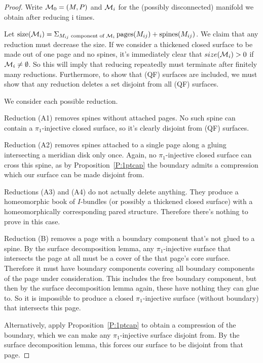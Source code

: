 \begin{proof}

Write $\mathcal{M}_0 = (M,P)$ and $\mathcal{M}_i$ for the (possibly disconnected) manifold we
obtain after reducing i times.

Let $\operatorname{size}(\mathcal{M}_i) = \Sigma_{M_{ij} \text{ component of } \mathcal{M}_i}
\operatorname{pages}(M_{ij}) + \operatorname{spines}(M_{ij})$. We claim that
any reduction must decrease the size. If we consider a thickened closed surface
to be made out of one page and no spines, it's immediately clear that
$size(\mathcal{M}_i)>0$ if $\mathcal{M}_i \neq \emptyset$.  So this will imply that reducing
repeatedly must terminate after finitely many reductions. Furthermore, to show
that (QF) surfaces are included, we must show that any reduction deletes a set
disjoint from all (QF) surfaces.

We consider each possible reduction.

Reduction (A1) removes spines without attached pages. No such spine can contain
a $\pi_1$-injective closed surface, so it's clearly disjoint from (QF)
surfaces.

Reduction (A2) removes spines attached to a single page along a gluing
intersecting a meridian disk only once. Again, no $\pi_1$-injective closed
surface can cross this spine, as by Proposition~\ref{P:1ptcap} the boundary
admits a compression which our surface can be made disjoint from.

Reductions (A3) and (A4) do not actually delete anything. They produce
a homeomorphic book of $I$-bundles (or possibly a thickened closed surface)
with a homeomorphically corresponding pared structure. Therefore there's
nothing to prove in this case.

Reduction (B) removes a page with a boundary component that's not glued to
a spine. By the surface decomposition lemma, any $\pi_1$-injective surface that
intersects the page at all must be a cover of the that page's core surface.
Therefore it must have boundary components covering all boundary components of
the page under consideration. This includes the free boundary component, but
then by the surface decomposition lemma again, these have nothing they can glue
to. So it is impossible to produce a closed $\pi_1$-injective surface (without
boundary) that intersects this page.

Alternatively, apply Proposition~\ref{P:1ptcap} to obtain a compression of the
boundary, which we can make any $\pi_1$-injective surface disjoint from. By the
surface decomposition lemma, this forces our surface to be disjoint from that
page.


\end{proof}
